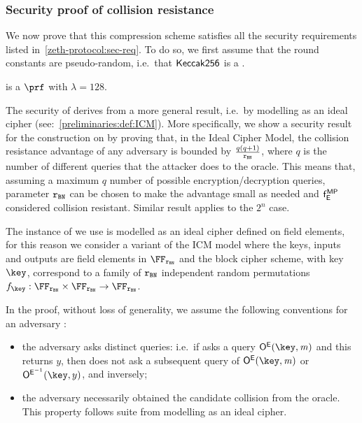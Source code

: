 \subsubsection{Security proof of \mimcMPPrime{} collision resistance}\label{instantiation:mkhash:security:colres-proof}
We now prove that this compression scheme satisfies all the security requirements listed in~\cref{zeth-protocol:sec-req}. To do so, we first assume that the round constants are pseudo-random, i.e.~that $\mathsf{Keccak{256}}$ is a \prf{}.

\begin{lemma}
	 is a $\prf$ with $\lambda=128$.
\end{lemma}

The security of \mimcMPPrime{} derives from a more general result, i.e.~by modelling \mimcPrime{} as an ideal cipher (see:~\cref{preliminaries:def:ICM}). More specifically, we show a security result for the \MP{} construction on \FFx{\rBN} by proving that, in the Ideal Cipher Model, the collision resistance advantage of any adversary is bounded by $\frac{q(q+1)}{\mathtt{r_{BN}}}$, where $q$ is the number of different queries that the attacker does to the oracle. This means that, assuming a maximum $q$ number of possible encryption/decryption queries, parameter $\mathtt{r_{BN}}$ can be chosen to make the advantage small as needed and $\mathsf{f}_{\mathsf{E}}^{\mathsf{MP}}$ considered collision resistant. Similar result applies to the ${2^n}$ case.

The instance of \mimc{} we use is modelled as an ideal cipher defined on field elements, for this reason we consider a variant of the ICM model where the keys, inputs and outputs are field elements in $\FFx{\rBN}$ and the block cipher scheme, with key $\key$, correspond to a family of $\mathtt{r_{BN}}$ independent random permutations $f_{\key}: \FFx{\rBN} \times \FFx{\rBN} \to \FFx{\rBN}$.

In the proof, without loss of generality, we assume the following conventions for an adversary \adv{}:
\begin{itemize}
    \item the adversary asks distinct queries: i.e.~if \adv{} asks a query $\oracleEnc(\key,\msg)$ and this returns $y$, then \adv{} does not ask a subsequent query of $\oracleEnc(\key,\msg)$ or $\oracleDec(\key,y)$, and inversely;
    \item the adversary necessarily obtained the candidate collision from the oracle. This property follows suite from modelling \mimc{} as an ideal cipher.
\end{itemize} 

